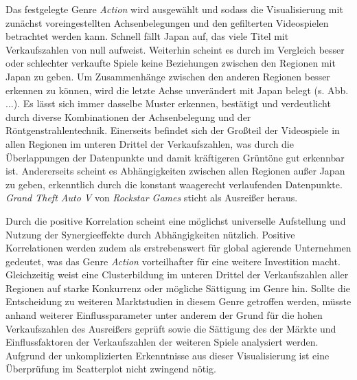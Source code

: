 \documentclass[usegeometry=true]{scrartcl}
\begin{document}
Das festgelegte Genre \textit{Action} wird ausgewählt und sodass die Visualisierung mit zunächst voreingestellten Achsenbelegungen und den gefilterten Videospielen betrachtet werden kann. 
Schnell fällt Japan auf, das viele Titel mit Verkaufszahlen von null aufweist. 
Weiterhin scheint es durch im Vergleich besser oder schlechter verkaufte Spiele keine Beziehungen zwischen den Regionen mit Japan zu geben.
Um Zusammenhänge zwischen den anderen Regionen besser erkennen zu können, wird die letzte Achse unverändert mit Japan belegt (s. Abb. ...).
Es lässt sich immer dasselbe Muster erkennen, bestätigt und verdeutlicht durch diverse Kombinationen der Achsenbelegung und der Röntgenstrahlentechnik.
Einerseits befindet sich der Großteil der Videospiele in allen Regionen im unteren Drittel der Verkaufszahlen, was durch die Überlappungen der Datenpunkte und damit kräftigeren Grüntöne gut erkennbar ist.
Andererseits scheint es Abhängigkeiten zwischen allen Regionen außer Japan zu geben, erkenntlich durch die konstant waagerecht verlaufenden Datenpunkte.
\textit{Grand Theft Auto V} von \textit{Rockstar Games} sticht als Ausreißer heraus. 

Durch die positive Korrelation scheint eine möglichst universelle Aufstellung und Nutzung der Synergieeffekte durch Abhängigkeiten nützlich.
Positive Korrelationen werden zudem als erstrebenswert für global agierende Unternehmen gedeutet, was das Genre \textit{Action} vorteilhafter für eine weitere Investition macht.
Gleichzeitig weist eine Clusterbildung im unteren Drittel der Verkaufszahlen aller Regionen auf starke Konkurrenz oder mögliche Sättigung im Genre hin. 
Sollte die Entscheidung zu weiteren Marktstudien in diesem Genre getroffen werden, 
müsste anhand weiterer Einflussparameter unter anderem der Grund für die hohen Verkaufszahlen des Ausreißers geprüft sowie die Sättigung des der Märkte und Einflussfaktoren der Verkaufszahlen der weiteren Spiele analysiert werden.
Aufgrund der unkomplizierten Erkenntnisse aus dieser Visualisierung ist eine Überprüfung im Scatterplot nicht zwingend nötig.
\end{document}
